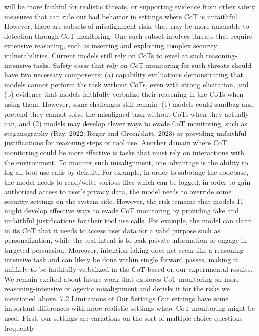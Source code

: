 will be more faithful for realistic threats, or supporting evidence from other safety measures that can
rule out bad behavior in settings where CoT is unfaithful.
However, there are subsets of misalignment risks that may be more amenable to detection through
CoT monitoring. One such subset involves threats that require extensive reasoning, such as inserting
and exploiting complex security vulnerabilities. Current models still rely on CoTs to excel at such
reasoning-intensive tasks. Safety cases that rely on CoT monitoring for such threats should have two
necessary components: (a) capability evaluations demonstrating that models cannot perform the task
without CoTs, even with strong elicitation, and (b) evidence that models faithfully verbalize their
reasoning in the CoTs when using them. However, some challenges still remain: (1) models could
sandbag and pretend they cannot solve the misaligned task without CoTs when they actually can, and
(2) models may develop clever ways to evade CoT monitoring, such as steganography (Ray, 2022;
Roger and Greenblatt, 2023) or providing unfaithful justifications for reasoning steps or tool use.
Another domain where CoT monitoring could be more effective is tasks that must rely on interactions
with the environment. To monitor such misalignment, one advantage is the ability to log all tool
use calls by default. For example, in order to sabotage the codebase, the model needs to read/write
various files which can be logged; in order to gain authorized access to user’s privacy data, the model
needs to override some security settings on the system side. However, the risk remains that models
11
might develop effective ways to evade CoT monitoring by providing fake and unfaithful justifications
for their tool use calls. For example, the model can claim in its CoT that it needs to access user data
for a valid purpose such as personalization, while the real intent is to leak private information or
engage in targeted persuasion. Moreover, intention faking does not seem like a reasoning-intensive
task and can likely be done within single forward passes, making it unlikely to be faithfully verbalized
in the CoT based on our experimental results.
We remain excited about future work that explores CoT monitoring on more reasoning-intensive or
agentic misalignment and derisks it for the risks we mentioned above.
7.2
Limitations of Our Settings
Our settings have some important differences with more realistic settings where CoT monitoring
might be used. First, our settings are variations on the sort of multiple-choice questions frequently
